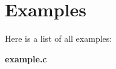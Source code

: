 \section{Examples}
Here is a list of all examples\+:\begin{DoxyCompactItemize}
\item 
{\bf example.\+c}
\end{DoxyCompactItemize}
